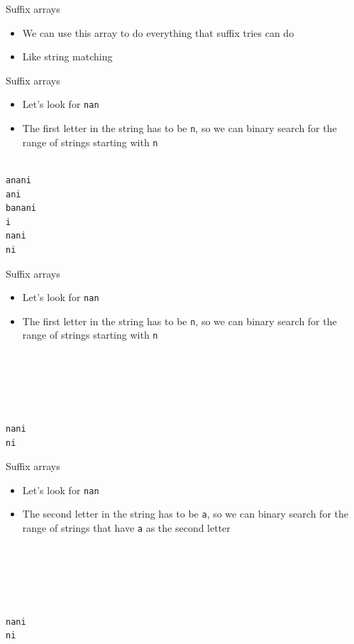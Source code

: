 \documentclass{beamer}
\begin{document}
\begin{frame}[fragile]{Suffix arrays}
    \begin{itemize}
        \item We can use this array to do everything that suffix tries can do
            \vspace{10pt}
        \item Like string matching
    \end{itemize}
\end{frame}

\begin{frame}[fragile]{Suffix arrays}
    \begin{itemize}
\item Let's look for \texttt{nan}
\item<2-> The first letter in the string has to be \texttt{n}, so we can binary search for the range of strings starting with \texttt{n}
    \end{itemize}
    \vspace{10pt}
    \begin{verbatim}

anani
ani
banani
i
nani
ni
    \end{verbatim}
\end{frame}

\begin{frame}[fragile]{Suffix arrays}
    \begin{itemize}
\item Let's look for \texttt{nan}
\item The first letter in the string has to be \texttt{n}, so we can binary search for the range of strings starting with \texttt{n}
    \end{itemize}
    \vspace{10pt}
    \begin{verbatim}





nani
ni
    \end{verbatim}
\end{frame}

\begin{frame}[fragile]{Suffix arrays}
    \begin{itemize}
\item Let's look for \texttt{nan}
\item The second letter in the string has to be \texttt{a}, so we can binary search for the range of strings that have \texttt{a} as the second letter
    \end{itemize}
    \vspace{10pt}
    \begin{verbatim}





nani
ni
    \end{verbatim}
\end{frame}
\end{document}
